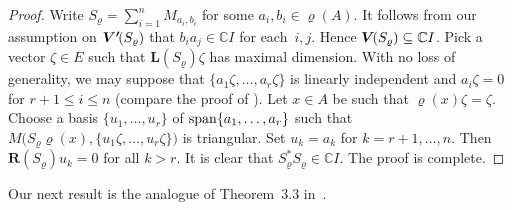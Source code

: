 \documentclass[a4paper,12pt,reqno]{amsart}
\numberwithin{equation}{section}
\theoremstyle{definition}
\begin{document}
\begin{proof}
Write $S_\varrho=\sum_{i=1}^n {M_{a_i,b_i}}$ for some $a_i,b_i\in\varrho(A)$.
It follows from our assumption on ${{\bm{V'}\mkern-2.5mu(S_\varrho)}}$ that
$b_ia_j\in {\mathbb{C}} I $ for each~$i,j$. Hence ${{\bm V\mkern-2.5mu(S_\varrho)}}\subseteq{\mathbb{C}} I$.  Pick a vector $\zeta \in E$ such that ${{\bm L(S_\varrho)}} \zeta$ has maximal dimension.
With no loss of generality, we may suppose that $\{a_1 \zeta, \ldots, a_r \zeta\}$ is linearly independent and
$a_i \zeta=0$ for $r+1 \leq i \leq n$ (compare the proof of \cite[Proposition~3.1]{NaMa13}).
Let $x\in A$ be such that $\varrho(x) \zeta=\zeta $.
Choose a basis  $\{u_1, \ldots, u_r\}$ of ${{\rm span}} \{a_1, \ldots, a_r\}$ such that
$M\bigl(S_\varrho\varrho(x), \{u_1 \zeta, \ldots, u_r \zeta\}\bigr)$ is triangular.
Set $u_k= a_k$ for $k=r+1, \ldots, n$. Then ${{\bm R(S_\varrho)}} u_k=0$ for all $k >r$.
It is clear  that $S_\varrho^* S_\varrho^{}\in {\mathbb{C}} I$. The proof is complete.
\end{proof}

Our next result is the analogue of Theorem~3.3 in~\cite{NaMa13}.
\end{document}

